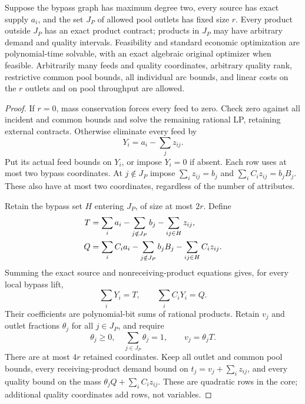 \begin{theorem}\label{s5:fixed-products}
Suppose the bypass graph has maximum degree two, every source has exact
supply $a_i$, and the set $J_P$ of allowed pool outlets has fixed size
$r$. Every product outside $J_P$ has an exact product contract; products
in $J_P$ may have arbitrary demand and quality intervals. Feasibility
and standard economic optimization are polynomial-time solvable, with
an exact algebraic original optimizer when feasible. Arbitrarily many
feeds and quality coordinates, arbitrary quality rank, restrictive
common pool bounds, all individual arc bounds, and linear
costs on the $r$ outlets and on pool throughput are allowed.
\end{theorem}
\begin{proof}
If $r=0$, mass conservation forces every feed to zero. Check zero against
all incident and common bounds and solve the remaining rational LP,
retaining external contracts. Otherwise eliminate every feed by
\[
 Y_i=a_i-\sum_jz_{ij}.
\]
Put its actual feed bounds on $Y_i$, or impose $Y_i=0$ if absent. Each
row uses at most two bypass coordinates. At $j\notin J_P$ impose
$\sum_i z_{ij}=b_j$ and $\sum_i C_i z_{ij}=b_jB_j$. These also have
at most two coordinates, regardless of the number of attributes.

Retain the bypass set $H$ entering $J_P$, of size at most $2r$. Define
\begin{align}
 T&=\sum_i a_i-\sum_{j\notin J_P}b_j-\sum_{ij\in H}z_{ij},\notag\\
 Q&=\sum_i C_i a_i-\sum_{j\notin J_P}b_jB_j
                         -\sum_{ij\in H}C_i z_{ij}.
 \label{s5:boundary-masses}
\end{align}
Summing the exact source and nonreceiving-product equations gives,
for every local bypass lift,
\begin{equation}
 \sum_iY_i=T,\qquad \sum_i C_iY_i=Q.
 \label{s5:boundary-identities}
\end{equation}
Their coefficients are polynomial-bit sums of rational products.
Retain $v_j$ and outlet fractions $\theta_j$ for all $j\in J_P$, and
require
\[
 \theta_j\ge0,\quad\sum_{j\in J_P}\theta_j=1,\qquad
 v_j=\theta_jT.
\]
There are at most $4r$ retained coordinates. Keep all outlet and common
pool bounds, every receiving-product demand bound on
$t_j=v_j+\sum_i z_{ij}$, and every quality bound on the mass
$\theta_jQ+\sum_i C_i z_{ij}$. These are quadratic rows in the core;
additional quality coordinates add rows, not variables.


\end{proof}
